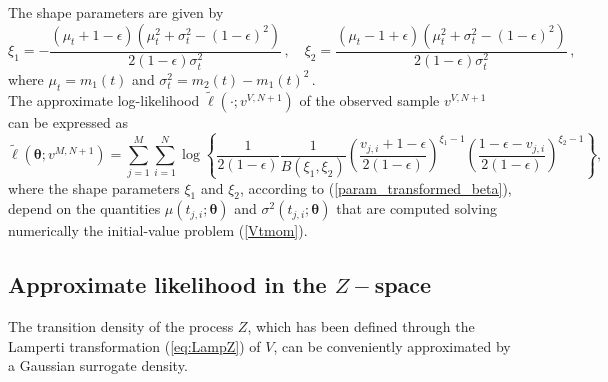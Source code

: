 \documentclass[11pt]{article}
\theoremstyle{definition}
\begin{document}
The shape parameters are given by
\begin{equation}
\xi_1 = - \frac{(\mu_t + 1 - \epsilon)(\mu_t^2 + \sigma_t^2 - (1- \epsilon)^2)}{2 (1 - \epsilon) \sigma_t^2}\,, \quad \xi_2=  \frac{(\mu_t-1 + \epsilon )(\mu_t^2 + \sigma_t^2 - (1- \epsilon)^2)}{2 (1 - \epsilon) \sigma_t^2} \,, \label{param_transformed_beta}
\end{equation}
where $\mu_t = m_1 (t)$ and $\sigma_t^2= m_2 (t)- m_1 (t)^2\,.$ \\

The approximate log-likelihood $\tilde{\ell}(\cdot ; v^{V, N+1})$ of the observed sample $v^{V, N+1}$ can be expressed as 
\begin{equation}
 \tilde{\ell} \left(\bm{\theta}; v^{M,N +1}\right) = \sum_{j=1}^M \sum_{i=1}^N \log  \left\{ \frac{1}{2(1 - \epsilon)} \frac{1}{B(\xi_1, \xi_2)} \left( \frac{v_{j,i} + 1 - \epsilon}{2(1 - \epsilon)} \right)^{\xi_1 -1}  \left( \frac{1 - \epsilon - v_{j,i}}{2(1 - \epsilon)} \right)^{\xi_2 -1} \right\},
\label{eq:loglikelihoodV}
\end{equation}
where the shape parameters $\xi_1$ and $\xi_2$, according to (\ref{param_transformed_beta}), depend on the quantities $\mu(t_{j,i};\bm{\theta} )$ and $\sigma^2(t_{j,i};\bm{\theta} )$ that are computed solving numerically the initial-value problem (\ref{Vtmom}). 

\subsection{Approximate likelihood  in the $Z-$space}

The transition density of the process $Z$, which has been defined through the Lamperti transformation (\ref{eq:LampZ}) of $V$, can be conveniently approximated by a Gaussian surrogate density. 
\end{document}
